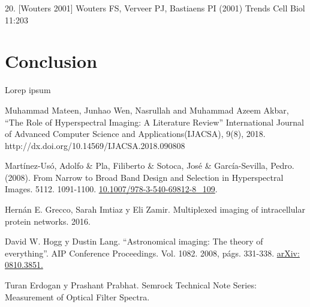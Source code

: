 \documentclass{ctuthesis}
\begin{document}
20. [Wouters 2001] Wouters FS, Verveer PJ, Bastiaens PI (2001) Trends Cell Biol 11:203
\chapter{Conclusion}

Lorep ipsum \cite{doe}


\renewcommand\bibname{Referencias Bibliográficas}
\begin{thebibliography}{1}

 Muhammad Mateen, Junhao Wen, Nasrullah and Muhammad Azeem 
Akbar, “The Role of Hyperspectral Imaging: A Literature Review” International 
Journal of Advanced Computer Science and Applications(IJACSA), 9(8), 2018. 
http://dx.doi.org/10.14569/IJACSA.2018.090808

 Martínez-Usó, Adolfo \& Pla, Filiberto \& Sotoca, José 
\& 
García-Sevilla, Pedro.(2008). From Narrow to Broad Band Design and Selection 
in Hyperspectral Images. 5112. 1091-1100. 
\href{https://www.researchgate.net/publication/221472272_From_Narrow_to_Broad_Band_Design_and_Selection_in_Hyperspectral_Images}{10.1007/978-3-540-69812-8\_109}.
 
 Hernán E. Grecco, Sarah Imtiaz y Eli Zamir. Multiplexed
imaging of intracellular protein networks. 2016.

 David W. Hogg y Dustin Lang. “Astronomical imaging: The
	theory of everything”. AIP Conference Proceedings. Vol. 1082.
	2008, págs. 331-338. \href{https://arxiv.org/pdf/0810.3851.pdf}{arXiv: 
	0810.3851.}

 Turan Erdogan y Prashant Prabhat. Semrock Technical Note 
Series: Measurement of 
Optical Filter Spectra. 

\end{thebibliography}
\end{document}
